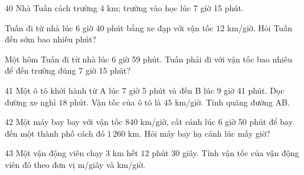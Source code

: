\gap
\begin{probbox}{40}{}
Nhà Tuấn cách trường $4$ km; trường vào học lúc 7 giờ 15 phút.\par
{} Tuấn đi từ nhà lúc 6 giờ 40 phút bằng xe đạp với vận tốc $12$ km/giờ. Hỏi Tuấn đến sớm bao nhiêu phút?\par
{} Một hôm Tuấn đi từ nhà lúc 6 giờ 59 phút. Tuấn phải đi với vận tốc bao nhiêu để đến trường đúng 7 giờ 15 phút?
\end{probbox}
\gap
\begin{probbox}{41}{}
Một ô tô khởi hành từ A lúc 7 giờ 5 phút và đến B lúc 9 giờ 41 phút. Dọc đường xe nghỉ $18$ phút. Vận tốc của ô tô là $45$ km/giờ. Tính quãng đường AB.
\end{probbox}
\gap
\begin{probbox}{42}{}
Một máy bay bay với vận tốc $840$ km/giờ, cất cánh lúc 6 giờ 50 phút để bay đến một thành phố cách đó $1\,260$ km. Hỏi máy bay hạ cánh lúc mấy giờ?
\end{probbox}
\gap
\begin{probbox}{43}{}
Một vận động viên chạy $3$ km hết $12$ phút $30$ giây. Tính vận tốc của vận động viên đó theo đơn vị m/giây và km/giờ.
\end{probbox}
